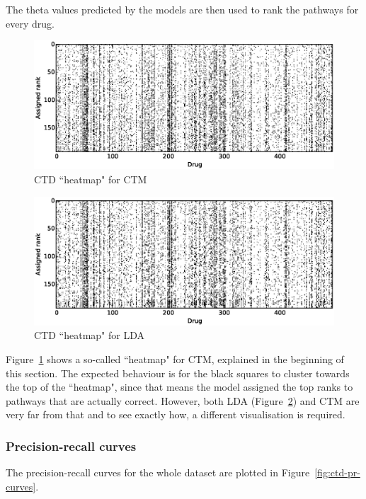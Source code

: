 \documentclass[12pt,a4paper,twoside,openright]{report}
\begin{document}
The theta values predicted by the models are then used to rank the pathways for every drug.

\begin{figure}[!htb]
\includegraphics[width=\textwidth]{ctm-ctd-heatmap.eps}
\caption{CTD ``heatmap" for CTM}
\label{fig:ctm-ctd-heatmap}
\end{figure}

\begin{figure}[!htb]
\includegraphics[width=\textwidth]{lda-ctd-heatmap.eps}
\caption{CTD ``heatmap" for LDA}
\label{fig:lda-ctd-heatmap}
\end{figure}

Figure~\ref{fig:ctm-ctd-heatmap} shows a so-called ``heatmap" for CTM, explained in the beginning of this section. The expected behaviour is for the black squares to cluster towards the top of the ``heatmap", since that means the model assigned the top ranks to pathways that are actually correct. However, both LDA (Figure~\ref{fig:lda-ctd-heatmap}) and CTM are very far from that and to see exactly how, a different visualisation is required.


\subsubsection{Precision-recall curves}

The precision-recall curves for the whole dataset are plotted in Figure~\ref{fig:ctd-pr-curves}.
\end{document}
